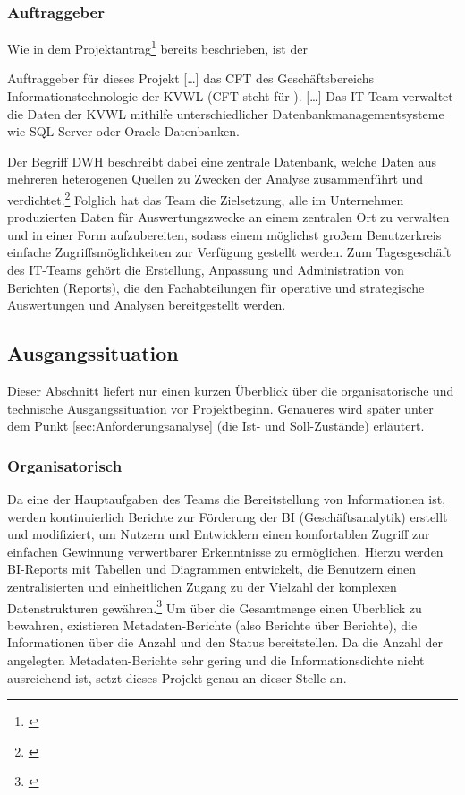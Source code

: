 \subsubsection{Auftraggeber}\label{sec:Auftraggeber}
Wie in dem Projektantrag\footnote{\cite{Projektantrag}} bereits beschrieben, ist der
\begin{displayquote}
	Auftraggeber für dieses Projekt [\ldots] das \acs{CFT} \teamName des Geschäftsbereichs Informationstechnologie der \ac{KVWL} (\acs{CFT} steht für ).
	[\ldots]
	Das IT-Team \teamName verwaltet die Daten der \ac{KVWL} mithilfe unterschiedlicher Datenbankmanagementsysteme wie SQL Server oder Oracle Datenbanken.
\end{displayquote}
Der Begriff \ac{DWH} beschreibt dabei eine zentrale Datenbank, welche Daten aus mehreren heterogenen Quellen zu Zwecken der Analyse zusammenführt und verdichtet.\footnote{\Vgl \cite{wiki:dwh}}
Folglich hat das Team die Zielsetzung, alle im Unternehmen produzierten Daten für Auswertungszwecke an einem zentralen Ort zu verwalten und in einer Form aufzubereiten, sodass einem möglichst großem Benutzerkreis einfache Zugriffsmöglichkeiten zur Verfügung gestellt werden.
Zum Tagesgeschäft des IT-Teams \teamName gehört die Erstellung, Anpassung und Administration von Berichten (Reports), die den Fachabteilungen für operative und strategische Auswertungen und Analysen bereitgestellt werden.

\subsection{Ausgangssituation}\label{sec:Ausgangssituation}
Dieser Abschnitt liefert nur einen kurzen Überblick über die organisatorische und technische Ausgangssituation vor Projektbeginn. Genaueres wird später unter dem Punkt \ref{sec:Anforderungsanalyse} (\ua die Ist- und Soll-Zustände) erläutert.

\subsubsection{Organisatorisch}\label{sec:Ausgangssituation:Organisatorisch}
Da eine der Hauptaufgaben des Teams die Bereitstellung von Informationen ist, werden kontinuierlich Berichte zur Förderung der \ac{BI} (Geschäftsanalytik) erstellt und modifiziert, um Nutzern und Entwicklern einen komfortablen Zugriff zur einfachen Gewinnung verwertbarer Erkenntnisse zu ermöglichen. Hierzu werden \ac{BI}-Reports mit Tabellen und Diagrammen entwickelt, die Benutzern einen zentralisierten und einheitlichen Zugang zu der Vielzahl der komplexen Datenstrukturen gewähren.\footnote{\Vgl \cite{Projektantrag}}
Um über die Gesamtmenge einen Überblick zu bewahren, existieren Metadaten-Berichte (also Berichte über Berichte), die \zB Informationen über die Anzahl und den Status bereitstellen.
Da die Anzahl der angelegten Metadaten-Berichte sehr gering und die Informationsdichte nicht ausreichend ist, setzt dieses Projekt genau an dieser Stelle an.


